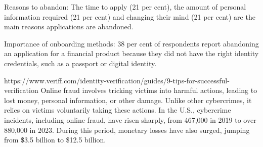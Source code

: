 Reasons to abandon: The time to apply (21 per cent), the amount of personal information required (21 per cent) and changing their mind (21 per cent) are the main reasons applications are abandoned.

Importance of onboarding methods: 38 per cent of respondents report abandoning an application for a financial product because they did not have the right identity credentials, such as a passport or digital identity.


https://www.veriff.com/identity-verification/guides/9-tips-for-successful-verification 
Online fraud involves tricking victims into harmful actions, leading to lost money, personal information, or other damage. Unlike other cybercrimes, it relies on victims voluntarily taking these actions. In the U.S., cybercrime incidents, including online fraud, have risen sharply, from 467,000 in 2019 to over 880,000 in 2023. During this period, monetary losses have also surged, jumping from \$3.5 billion to \$12.5 billion.





